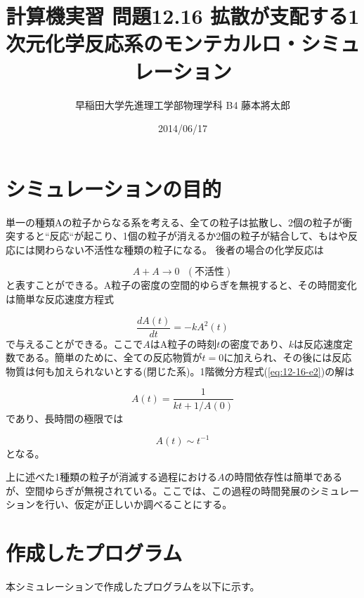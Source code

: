 \documentclass{jsarticle}
\title{計算機実習 問題12.16 拡散が支配する1次元化学反応系のモンテカルロ・シミュレーション}
\author{早稲田大学先進理工学部物理学科 B4 藤本將太郎}
\date{2014/06/17}
\begin{document}
\maketitle
    
    \section{シミュレーションの目的}
        単一の種類Aの粒子からなる系を考える、全ての粒子は拡散し、2個の粒子が衝突すると``反応``が起こり、1個の粒子が消えるか2個の粒子が結合して、もはや反応には関わらない不活性な種類の粒子になる。
        後者の場合の化学反応は
        
        \begin{equation}
            A + A \rightarrow 0\ \ \ (不活性)
            \label{eq:12-16-e1}
        \end{equation}
        と表すことができる。A粒子の密度の空間的ゆらぎを無視すると、その時間変化は簡単な反応速度方程式
        
        \begin{equation}
            \frac{dA(t)}{dt} = -kA^{2}(t)
            \label{eq:12-16-e2}
        \end{equation}
        で与えることができる。ここで$A$はA粒子の時刻$t$の密度であり、$k$は反応速度定数である。簡単のために、全ての反応物質が$t=0$に加えられ、その後には反応物質は何も加えられないとする(閉じた系)。1階微分方程式(\ref{eq:12-16-e2})の解は
        
        \begin{equation}
            A(t) = \frac{1}{kt + 1/A(0)}
            \label{eq:12-16-e3}
        \end{equation}
        であり、長時間の極限では
        
        \begin{equation}
            A(t) \sim t^{-1}
            \label{eq:12-16-e4}
        \end{equation}
        となる。
        
        上に述べた1種類の粒子が消滅する過程における$A$の時間依存性は簡単であるが、空間ゆらぎが無視されている。ここでは、この過程の時間発展のシミュレーションを行い、仮定が正しいか調べることにする。
        
        
    \section{作成したプログラム}
        本シミュレーションで作成したプログラムを以下に示す。
    
\end{document}
